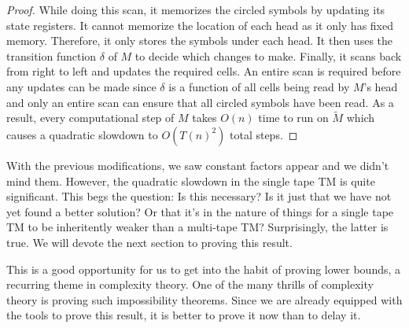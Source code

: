 \documentclass[usletter]{article}
\begin{document}
\begin{itemize}
\begin{proof}
    While doing this scan, it memorizes the circled symbols
    by updating its state registers. It cannot memorize the location of each head as it only has fixed memory. Therefore,
    it only stores the symbols under each head. It then uses the transition function \(\delta\) of \(M\) to decide which changes to make.
    Finally, it scans back from right to left and updates the required cells. An entire scan is required before any updates can be made since
    \(\delta\) is a function of all cells being read by \(M\)'s head and only an entire scan can ensure that all circled symbols have been read. 
    As a result, every computational step of \(M\) takes \(O(n)\) time to run on \(\tilde{M}\) which causes a quadratic slowdown to \(O(T(n)^2)\) total steps. 
\end{proof}

\end{itemize}

With the previous modifications, we saw constant factors appear and we didn't mind them. 
However, the quadratic slowdown in the single tape TM is quite significant. This begs the question: Is this necessary? 
Is it just that we have not yet found a better solution? Or that it's in the nature of things 
for a single tape TM to be inheritently weaker than a multi-tape TM? Surprisingly, the latter 
is true. We will devote the next section to proving this result.

\begin{remark}
    This is a good opportunity for us to get into the habit of proving lower bounds, a recurring
    theme in complexity theory. One of the many thrills of complexity theory is proving such impossibility theorems.
    Since we are already equipped with the tools to prove this result, it is better to prove it now than to delay
    it.
\end{remark}


\end{document}
